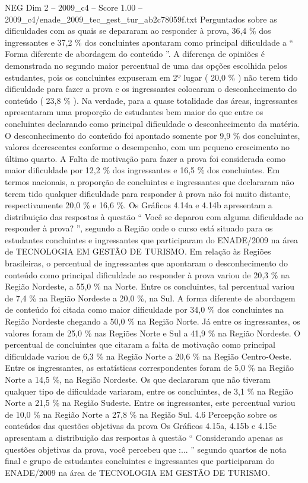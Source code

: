 \begin{textsample}{NEG Dim 2 – 2009\_c4 – Score 1.00 – 2009\_c4/enade\_2009\_tec\_gest\_tur\_ab2c78059f.txt}
Perguntados sobre as dificuldades com as quais se depararam ao responder à prova, 36,4 \% dos ingressantes e 37,2 \% dos concluintes apontaram como principal dificuldade a “ Forma diferente de abordagem do conteúdo ”.
A diferença de opiniões é demonstrada no segundo maior percentual de uma das opções escolhida pelos estudantes, pois os concluintes expuseram em 2º lugar ( 20,0 \% ) não terem tido dificuldade para fazer a prova e os ingressantes colocaram o desconhecimento do conteúdo ( 23,8 \% ).
Na verdade, para a quase totalidade das áreas, ingressantes apresentaram uma proporção de estudantes bem maior do que entre os concluintes declarando como principal dificuldade o desconhecimento da matéria.
O desconhecimento do conteúdo foi apontado somente por 9,9 \% dos concluintes, valores decrescentes conforme o desempenho, com um pequeno crescimento no último quarto.
A Falta de motivação para fazer a prova foi considerada como maior dificuldade por 12,2 \% dos ingressantes e 16,5 \% dos concluintes.
Em termos nacionais, a proporção de concluintes e ingressantes que declararam não terem tido qualquer dificuldade para responder à prova não foi muito distante, respectivamente 20,0 \% e 16,6 \%.
Os Gráficos 4.14a e 4.14b apresentam a distribuição das respostas à questão “ Você se deparou com alguma dificuldade ao responder à prova? ”, segundo a Região onde o curso está situado para os estudantes concluintes e ingressantes que participaram do ENADE/2009 na área de TECNOLOGIA EM GESTÃO DE TURISMO.
Em relação às Regiões brasileiras, o percentual de ingressantes que apontaram o desconhecimento do conteúdo como principal dificuldade ao responder à prova variou de 20,3 \% na Região Nordeste, a 55,0 \% na Norte.
Entre os concluintes, tal percentual variou de 7,4 \% na Região Nordeste a 20,0 \%, na Sul.
A forma diferente de abordagem de conteúdo foi citada como maior dificuldade por 34,0 \% dos concluintes na Região Nordeste chegando a 50,0 \% na Região Norte.
Já entre os ingressantes, os valores foram de 25,0 \% nas Regiões Norte e Sul a 41,9 \% na Região Nordeste.
O percentual de concluintes que citaram a falta de motivação como principal dificuldade variou de 6,3 \% na Região Norte a 20,6 \% na Região Centro-Oeste.
Entre os ingressantes, as estatísticas correspondentes foram de 5,0 \% na Região Norte a 14,5 \%, na Região Nordeste.
Os que declararam que não tiveram qualquer tipo de dificuldade variaram, entre os concluintes, de 3,1 \% na Região Norte a 21,5 \% na Região Sudeste.
Entre os ingressantes, este percentual variou de 10,0 \% na Região Norte a 27,8 \% na Região Sul. 4.6 Percepção sobre os conteúdos das questões objetivas da prova Os Gráficos 4.15a, 4.15b e 4.15c apresentam a distribuição das respostas à questão “ Considerando apenas as questões objetivas da prova, você percebeu que :... ” segundo quartos de nota final e grupo de estudantes concluintes e ingressantes que participaram do ENADE/2009 na área de TECNOLOGIA EM GESTÃO DE TURISMO.

\end{textsample}
